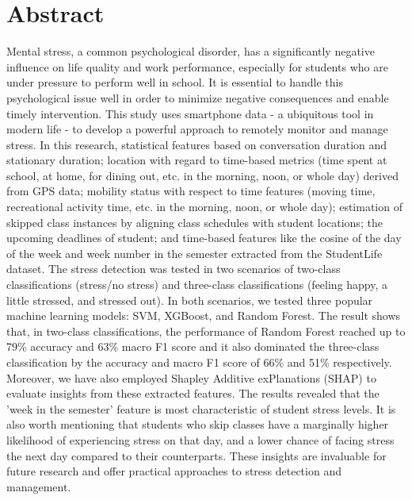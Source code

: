 \section*{Abstract}
\thispagestyle{empty}
\fontsize{13}{16}
\selectfont
 Mental stress, a common psychological disorder, has a significantly negative influence on life quality and work performance, especially for students who are under pressure to perform well in school. It is essential to handle this psychological issue well in order to minimize negative consequences and enable timely intervention. This study uses smartphone data - a ubiquitous tool in modern life - to develop a powerful approach to remotely monitor and manage stress. In this research, statistical features based on conversation duration and stationary duration; location with regard to time-based metrics (time spent at school, at home, for dining out, etc. in the morning, noon, or whole day) derived from GPS data; mobility status with respect to time features (moving time, recreational activity time, etc. in the morning, noon, or whole day); estimation of skipped class instances by aligning class schedules with student locations; the upcoming deadlines of student; and time-based features like the cosine of the day of the week and week number in the semester extracted from the StudentLife dataset. The stress detection was tested in two scenarios of two-class classifications (stress/no stress) and three-class classifications (feeling happy, a little stressed, and stressed out). In both scenarios, we tested three popular machine learning models: SVM, XGBoost, and Random Forest. The result shows that, in two-class classifications, the performance of Random Forest reached up to 79\% accuracy and 63\% macro F1 score and it also dominated the three-class classification by the accuracy and macro F1 score of 66\% and 51\% respectively. Moreover, we have also employed Shapley Additive exPlanations (SHAP) to evaluate insights from these extracted features. The results revealed that the 'week in the semester' feature is most characteristic of student stress levels. It is also worth mentioning that students who skip classes have a marginally higher likelihood of experiencing stress on that day, and a lower chance of facing stress the next day compared to their counterparts. These insights are invaluable for future research and offer practical approaches to stress detection and management.

\clearpage
{}
